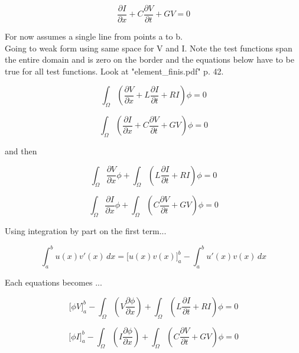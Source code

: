 \documentclass[12pt, letterpaper]{article}
\begin{document}
  
  \begin{equation}\frac{\partial{I}}{\partial{x}} + C \frac{\partial{V}}{\partial{t}} + G V = 0\end{equation}
  
  For now assumes a single line from points a to b.\\
  
Going to weak form using same space for V and I. Note the test functions span the entire domain and is zero on the border and the equations below have to be true for all test functions. Look at "element\_finis.pdf" p. 42.

\begin{equation}\int_\Omega(\frac{\partial{V}}{\partial{x}} + L \frac{\partial{I}}{\partial{t}} + R I) \phi = 0\end{equation}

\begin{equation}\int_\Omega(\frac{\partial{I}}{\partial{x}} + C \frac{\partial{V}}{\partial{t}} + G V) \phi = 0\end{equation}

and then


\begin{equation}
	\int_\Omega\frac{\partial{V}}{\partial{x}} \phi
	+ \int_\Omega(L \frac{\partial{I}}{\partial{t}} +  R I) \phi
	= 0
\end{equation}



\begin{equation}
	\int_\Omega\frac{\partial{I}}{\partial{x}} \phi
	+ \int_\Omega(C \frac{\partial{V}}{\partial{t}} +  G V) \phi
	= 0
\end{equation}

Using integration by part on the first term...

\begin{equation}\int_a^b u(x) v'(x) \, dx = \Big[u(x) v(x)\Big]_a^b - \int_a^b u'(x) v(x) \, dx\end{equation}

Each equations becomes ...

\begin{equation}
	\Big[\phi V \Big]_a^b
	-\int_\Omega(V \frac{\partial{\phi}}{\partial{x}})
	+ \int_\Omega(L \frac{\partial{I}}{\partial{t}} +  R I) \phi
	= 0
\end{equation}

\begin{equation}\Big[\phi I \Big]_a^b
	-\int_\Omega(I \frac{\partial{\phi}}{\partial{x}})
	+ \int_\Omega(C \frac{\partial{V}}{\partial{t}} +  G V) \phi
	= 0
\end{equation}
\end{document}
